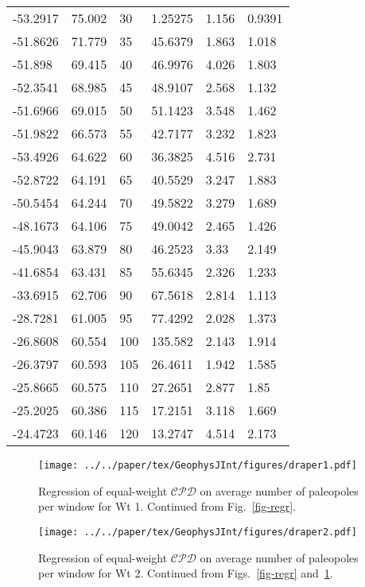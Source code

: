 \begin{longtable}[c]{@{}llllll@{}}
-53.2917 & 75.002 & 30 & 1.25275 & 1.156 & 0.9391 \\
-51.8626 & 71.779 & 35 & 45.6379 & 1.863 & 1.018 \\
-51.898 & 69.415 & 40 & 46.9976 & 4.026 & 1.803 \\
-52.3541 & 68.985 & 45 & 48.9107 & 2.568 & 1.132 \\
-51.6966 & 69.015 & 50 & 51.1423 & 3.548 & 1.462 \\
-51.9822 & 66.573 & 55 & 42.7177 & 3.232 & 1.823 \\
-53.4926 & 64.622 & 60 & 36.3825 & 4.516 & 2.731 \\
-52.8722 & 64.191 & 65 & 40.5529 & 3.247 & 1.883 \\
-50.5454 & 64.244 & 70 & 49.5822 & 3.279 & 1.689 \\
-48.1673 & 64.106 & 75 & 49.0042 & 2.465 & 1.426 \\
-45.9043 & 63.879 & 80 & 46.2523 & 3.33 & 2.149 \\
-41.6854 & 63.431 & 85 & 55.6345 & 2.326 & 1.233 \\
-33.6915 & 62.706 & 90 & 67.5618 & 2.814 & 1.113 \\
-28.7281 & 61.005 & 95 & 77.4292 & 2.028 & 1.373 \\
-26.8608 & 60.554 & 100 & 135.582 & 2.143 & 1.914 \\
-26.3797 & 60.593 & 105 & 26.4611 & 1.942 & 1.585 \\
-25.8665 & 60.575 & 110 & 27.2651 & 2.877 & 1.85 \\
-25.2025 & 60.386 & 115 & 17.2151 & 3.118 & 1.669 \\
-24.4723 & 60.146 & 120 & 13.2747 & 4.514 & 2.173 \\* \bottomrule
\end{longtable}

\begin{figure}
  \centering
  \texttt{[image: ../../paper/tex/GeophysJInt/figures/draper1.pdf]}
  \caption[Regression of $\mathcal{CPD}$ on average number of paleopoles per
    window for Wt 1]{Regression of equal-weight $\mathcal{CPD}$ on average
    number of paleopoles per window for Wt 1. Continued from
    Fig.~\ref{fig-regr}.}\label{fig-regr1}
\end{figure}

\begin{figure}
  \centering
  \texttt{[image: ../../paper/tex/GeophysJInt/figures/draper2.pdf]}
  \caption[Regression of $\mathcal{CPD}$ on average number of paleopoles per
    window for Wt 2]{Regression of equal-weight $\mathcal{CPD}$ on average
    number of paleopoles per window for Wt 2.  Continued from
    Figs.~\ref{fig-regr} and~\ref{fig-regr1}.}\label{fig-regr2}
\end{figure}

